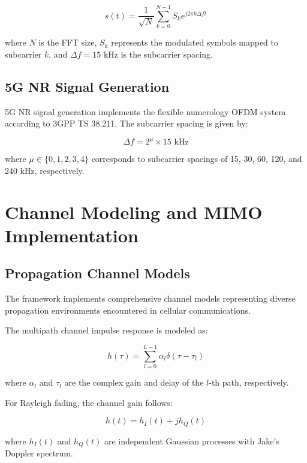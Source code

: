 \documentclass[twocolumn,10pt]{article}
\begin{document}
\begin{equation}
s(t) = \frac{1}{\sqrt{N}} \sum_{k=0}^{N-1} S_k e^{j2\pi k \Delta f t}
\end{equation}

where $N$ is the FFT size, $S_k$ represents the modulated symbols mapped to subcarrier $k$, and $\Delta f = 15$ kHz is the subcarrier spacing.

\subsection{5G NR Signal Generation}

5G NR signal generation implements the flexible numerology OFDM system according to 3GPP TS 38.211. The subcarrier spacing is given by:

\begin{equation}
\Delta f = 2^\mu \times 15 \text{ kHz}
\end{equation}

where $\mu \in \{0, 1, 2, 3, 4\}$ corresponds to subcarrier spacings of 15, 30, 60, 120, and 240 kHz, respectively.

\section{Channel Modeling and MIMO Implementation}

\subsection{Propagation Channel Models}

The framework implements comprehensive channel models representing diverse propagation environments encountered in cellular communications.

The multipath channel impulse response is modeled as:

\begin{equation}
h(\tau) = \sum_{l=0}^{L-1} \alpha_l \delta(\tau - \tau_l)
\end{equation}

where $\alpha_l$ and $\tau_l$ are the complex gain and delay of the $l$-th path, respectively.

For Rayleigh fading, the channel gain follows:

\begin{equation}
h(t) = h_I(t) + jh_Q(t)
\end{equation}

where $h_I(t)$ and $h_Q(t)$ are independent Gaussian processes with Jake's Doppler spectrum.
\end{document}
